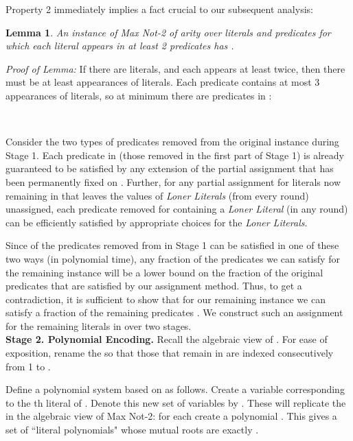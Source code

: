 \documentclass{article}
\newtheorem{lemma}[]{Lemma}
\begin{document}
\noindent Property 2 immediately implies a fact crucial to our subsequent analysis:

\begin{lemma} \label{twofifths} An instance of \textit{Max Not-2} of arity  over literals  and predicates  for which each literal appears in at least 2 predicates has .
\end{lemma}

\noindent\textit{Proof of Lemma:} If there are  literals, and each appears at least twice, then there must be at least  appearances of literals. Each predicate contains at most 3 appearances of literals, so at minimum there are  predicates in :

\begin{flushright}\\
\end{flushright}

Consider the two types of predicates removed from the original instance during Stage 1.  Each predicate in  (those removed in the first part of Stage 1) is already guaranteed to be satisfied by any extension of the partial assignment that has been  permanently fixed on . Further, for any partial assignment for literals now remaining in  that leaves the values of \textit{Loner Literals} (from every round) unassigned, 
each predicate removed for containing a \textit{Loner Literal} (in any round) can be efficiently satisfied by appropriate choices for the \textit{Loner Literals}. 

Since  of the predicates removed from  in Stage 1 can be satisfied in one of these two ways (in polynomial time), any fraction of the predicates we can satisfy for the remaining instance  will be a lower bound on the fraction of the original predicates that are satisfied by our assignment method. Thus, to get a contradiction, it is sufficient to show that for our remaining instance we can satisfy a  fraction of the remaining predicates . We construct such an assignment for the remaining literals in  over two stages.\\


\noindent \textbf{Stage 2. Polynomial Encoding.} Recall the algebraic view of . For ease of exposition, rename the  so that those that remain in  are indexed consecutively from 1 to .

Define a polynomial system based on  as follows. Create a variable  corresponding to the th literal of . Denote this new set of variables by . These  will replicate the  in the algebraic view of Max Not-2: for each  create a polynomial . This gives a set of  ``literal polynomials" whose mutual roots are exactly . 
\end{document}
